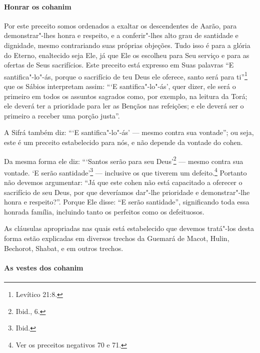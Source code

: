 \begin{multicols}{2}
\paragraph{Honrar os cohanim\starr{}}

Por este preceito somos ordenados a exaltar os descendentes de Aarão,
para demonstrar"-lhes honra e respeito, e a conferir"-lhes alto grau de
santidade e dignidade, mesmo contrariando suas próprias objeções. Tudo
isso é para a glória do Eterno, enaltecido seja Ele, já que Ele os
escolheu para Seu serviço e para as ofertas de Seus sacrifícios. Este
preceito está expresso em Suas palavras ``E santifica"-lo"-ás, porque o
sacrifício de teu Deus ele oferece, santo será para ti''\footnote{Levítico 21:8.}
que os Sábios interpretam assim: ```E santifica"-lo"-ás', quer dizer, ele
será o primeiro em todos os assuntos sagrados como, por exemplo, na
leitura da Torá\starr; ele deverá ter a prioridade para ler as Bençãos nas
refeições; e ele deverá ser o primeiro a receber uma porção justa''.

A Sifrá\starr{} também diz: ```E santifica"-lo"-ás' --- mesmo contra sua
vontade''; ou seja, este é um preceito estabelecido para nós, e não
depende da vontade do cohen\starr.

Da mesma forma ele diz: ```Santos serão para seu Deus'\footnote{Ibid., 6.} ---
mesmo contra sua vontade. `E serão santidade'\footnote{Ibid.} --- inclusive os
que tiverem um defeito.\footnote{Ver os preceitos negativos 70 e 71.} Portanto não devemos argumentar:
``Já que este cohen\starr{} não está capacitado a oferecer o sacrifício de seu Deus, por que deveríamos dar"-lhe prioridade e demonstrar"-lhe honra e respeito?''. Porque Ele
disse: ``E serão santidade'', significando toda essa honrada família, incluindo tanto os
perfeitos como os defeituosos.

As cláusulas apropriadas nas quais está estabelecido que devemos
tratá"-los desta forma estão explicadas em diversos trechos da Guemará\starr{} de
Macot\starr, Hulin\starr, Bechorot\starr, Shabat, e em outros trechos.

\paragraph{As vestes dos cohanim\starr{}}



\end{multicols}

